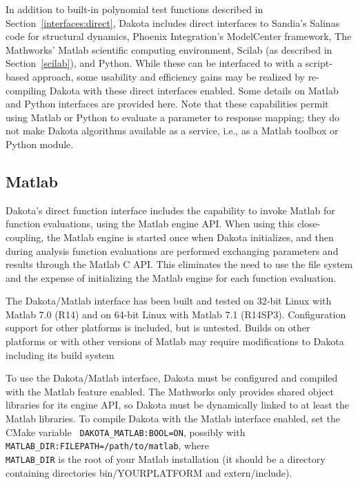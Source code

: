 In addition to built-in polynomial test functions described in
Section~\ref{interfaces:direct}, Dakota includes direct interfaces to
Sandia's Salinas code for structural dynamics, Phoenix Integration's
ModelCenter framework, The Mathworks' Matlab scientific computing
environment, Scilab (as described in Section~\ref{scilab}), and
Python. While these can be interfaced to with a script-based
approach, some usability and efficiency gains may be realized by
re-compiling Dakota with these direct interfaces enabled. Some
details on Matlab and Python interfaces are provided here. Note that
these capabilities permit using Matlab or Python to evaluate a
parameter to response mapping; they do not make Dakota algorithms
available as a service, i.e., as a Matlab toolbox or Python module.

\subsection{Matlab}\label{advint:existingdirect:matlab} 

Dakota's direct function interface includes the capability to invoke
Matlab for function evaluations, using the Matlab engine API. When
using this close-coupling, the Matlab engine is started once when
Dakota initializes, and then during analysis function evaluations are
performed exchanging parameters and results through the Matlab C API.
This eliminates the need to use the file system and the expense of
initializing the Matlab engine for each function evaluation.

The Dakota/Matlab interface has been built and tested on 32-bit Linux
with Matlab 7.0 (R14) and on 64-bit Linux with Matlab 7.1 (R14SP3).
Configuration support for other platforms is included, but is
untested. Builds on other platforms or with other versions of Matlab
may require modifications to Dakota including its build system

To use the Dakota/Matlab interface, Dakota must be configured and
compiled with the Matlab feature enabled. The Mathworks only provides
shared object libraries for its engine API, so Dakota must be
dynamically linked to at least the Matlab libraries. To compile
Dakota with the Matlab interface enabled, set the CMake variable {\tt
  DAKOTA\_MATLAB:BOOL=ON}, possibly with {\tt
  MATLAB\_DIR:FILEPATH=/path/to/matlab}, where \\ {\tt MATLAB\_DIR} is the
root of your Matlab installation (it should be a directory containing
directories bin/YOURPLATFORM and extern/include).

